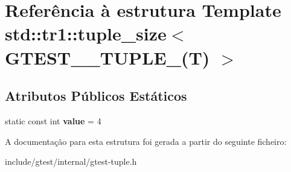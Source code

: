 \hypertarget{structstd_1_1tr1_1_1tuple__size_3_01GTEST__4__TUPLE___07T_08_01_4}{\section{Referência à estrutura Template std\-:\-:tr1\-:\-:tuple\-\_\-size$<$ G\-T\-E\-S\-T\-\_\-\_\-\-T\-U\-P\-L\-E\-\_\-(T) $>$}
\label{structstd_1_1tr1_1_1tuple__size_3_01GTEST__4__TUPLE___07T_08_01_4}
}
\subsection*{Atributos Públicos Estáticos}
\begin{DoxyCompactItemize}
\item 
\hypertarget{structstd_1_1tr1_1_1tuple__size_3_01GTEST__4__TUPLE___07T_08_01_4_a21078ed0600d243c5b82f7ba12269a53}{static const int {\bfseries value} = 4}\label{structstd_1_1tr1_1_1tuple__size_3_01GTEST__4__TUPLE___07T_08_01_4_a21078ed0600d243c5b82f7ba12269a53}

\end{DoxyCompactItemize}


A documentação para esta estrutura foi gerada a partir do seguinte ficheiro\-:\begin{DoxyCompactItemize}
\item 
include/gtest/internal/gtest-\/tuple.\-h\end{DoxyCompactItemize}
